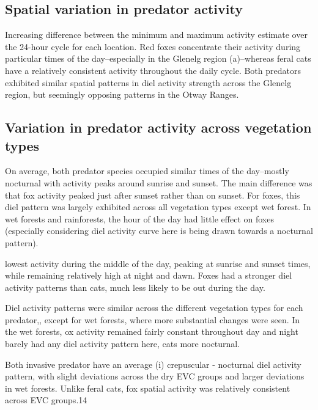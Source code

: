\documentclass[]{elsarticle} %
\begin{document}
\hypertarget{spatial-variation-in-predator-activity-1}{%
\subsection{Spatial variation in predator activity}\label{spatial-variation-in-predator-activity-1}}

Increasing difference between the minimum and maximum activity estimate over the 24-hour cycle for each location. Red foxes concentrate their activity during particular times of the day--especially in the Glenelg region (a)--whereas feral cats have a relatively consistent activity throughout the daily cycle. Both predators exhibited similar spatial patterns in diel activity strength across the Glenelg region, but seemingly opposing patterns in the Otway Ranges.

\hypertarget{variation-in-predator-activity-across-vegetation-types-1}{%
\subsection{Variation in predator activity across vegetation types}\label{variation-in-predator-activity-across-vegetation-types-1}}

On average, both predator species occupied similar times of the day--mostly nocturnal with activity peaks around sunrise and sunset. The main difference was that fox activity peaked just after sunset rather than on sunset. For foxes, this diel pattern was largely exhibited across all vegetation types except wet forest. In wet forests and rainforests, the hour of the day had little effect on foxes (especially considering diel activity curve here is being drawn towards a nocturnal pattern).

lowest activity during the middle of the day, peaking at sunrise and sunset times, while remaining relatively high at night and dawn.
Foxes had a stronger diel activity patterns than cats, much less likely to be out during the day.

Diel activity patterns were similar across the different vegetation types for each predator,, except for wet forests, where more substantial changes were seen. In the wet forests, ox activity remained fairly constant throughout day and night barely had any diel activity pattern here, cats more nocturnal.

Both invasive predator have an average (i) crepuscular - nocturnal diel activity pattern, with slight deviations across the dry EVC groups and larger deviations in wet forests. Unlike feral cats, fox spatial activity was relatively consistent across EVC groups.14
\end{document}
